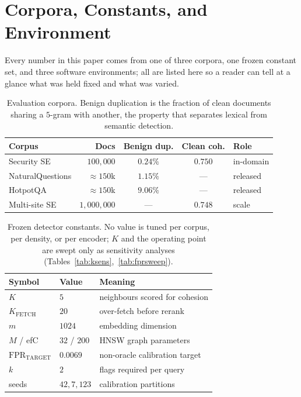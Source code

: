 \documentclass[10pt,journal,compsoc]{IEEEtran}
\begin{document}
\section{Corpora, Constants, and Environment}
\label{app:setup}

Every number in this paper comes from one of three corpora, one frozen constant set, and three software environments; all are listed here so a reader can tell at a glance what was held fixed and what was varied.

\begin{table}[H]
\centering
\scriptsize
\setlength{\tabcolsep}{3pt}
\caption{Evaluation corpora. Benign duplication is the fraction of clean documents sharing a
$5$-gram with another, the property that separates lexical from semantic detection.}
\label{tab:corpora}
\setlength{\tabcolsep}{4pt}
\begin{tabular}{lrccl}
\toprule
Corpus & Docs & Benign dup. & Clean coh. & Role \\
\midrule
Security SE      & $100{,}000$   & $0.24\%$ & $0.750$ & in-domain \\
NaturalQuestions& $\approx\!150$k & $1.15\%$ & --- & released \\
HotpotQA         & $\approx\!150$k & $9.06\%$ & --- & released \\
Multi-site SE    & $1{,}000{,}000$ & --- & $0.748$ & scale \\
\bottomrule
\end{tabular}
\end{table}

\begin{table}[H]
\centering
\caption{Frozen detector constants. No value is tuned per corpus, per density, or per encoder;
$K$ and the operating point are swept only as sensitivity analyses
(Tables~\ref{tab:ksens},~\ref{tab:fprsweep}).}
\label{tab:constants}
\setlength{\tabcolsep}{4pt}
\begin{tabular}{lll}
\toprule
Symbol & Value & Meaning \\
\midrule
$K$ & $5$ & neighbours scored for cohesion \\
$K_{\mathrm{FETCH}}$ & $20$ & over-fetch before rerank \\
$m$ & $1024$ & embedding dimension \\
$M$ / efC & $32$ / $200$ & HNSW graph parameters \\
$\mathrm{FPR}_{\mathrm{TARGET}}$ & $0.0069$ & non-oracle calibration target \\
$k$ & $2$ & flags required per query \\
seeds & $42,7,123$ & calibration partitions \\
\bottomrule
\end{tabular}
\end{table}
\end{document}
